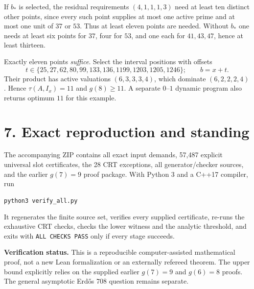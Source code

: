 \documentclass[11pt,a4paper]{article}
\begin{document}
If $b_*$ is selected, the residual requirements $(4,1,1,1,3)$ need at least ten distinct other points, since every such point supplies at most one active prime and at most one unit of $37$ or $53$. Thus at least eleven points are needed. Without $b_*$ one needs at least six points for $37$, four for $53$, and one each for $41,43,47$, hence at least thirteen.

Exactly eleven points \emph{suffice}. Select the interval positions with offsets
\[
 t\in\{25,27,62,80,99,133,136,1199,1203,1205,1246\};\qquad b=x+t.
\]
Their product has active valuations $(6,3,3,3,4)$, which dominate $(6,2,2,2,4)$. Hence $\tau(A,I_x)=11$ and $g(8)\ge11$. A separate $0$--$1$ dynamic program also returns optimum $11$ for this example.

\section*{7. Exact reproduction and standing}
The accompanying ZIP contains all exact input demands, 57,487 explicit universal slot certificates, the 28 CRT exceptions, all generator/checker sources, and the earlier $g(7)=9$ proof package. With Python 3 and a C++17 compiler, run
\begin{center}\texttt{python3 verify\_all.py}\end{center}
It regenerates the finite source set, verifies every supplied certificate, re-runs the exhaustive CRT checks, checks the lower witness and the analytic threshold, and exits with \texttt{ALL CHECKS PASS} only if every stage succeeds.

\textbf{Verification status.} This is a reproducible computer-assisted mathematical proof, not a new Lean formalization or an externally refereed theorem. The upper bound explicitly relies on the supplied earlier $g(7)=9$ and $g(6)=8$ proofs. The general asymptotic Erd\H{o}s 708 question remains separate.
\end{document}
